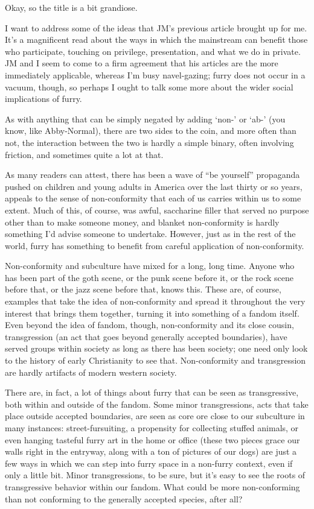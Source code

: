 
Okay, so the title is a bit grandiose.

I want to address some of the ideas that JM’s previous article brought up for me. It’s a magnificent read about the ways in which the mainstream can benefit those who participate, touching on privilege, presentation, and what we do in private. JM and I seem to come to a firm agreement that his articles are the more immediately applicable, whereas I’m busy navel-gazing; furry does not occur in a vacuum, though, so perhaps I ought to talk some more about the wider social implications of furry.

As with anything that can be simply negated by adding `non-' or `ab-' (you know, like Abby-Normal), there are two sides to the coin, and more often than not, the interaction between the two is hardly a simple binary, often involving friction, and sometimes quite a lot at that.

As many readers can attest, there has been a wave of ``be yourself'' propaganda pushed on children and young adults in America over the last thirty or so years, appeals to the sense of non-conformity that each of us carries within us to some extent. Much of this, of course, was awful, saccharine filler that served no purpose other than to make someone money, and blanket non-conformity is hardly something I’d advise someone to undertake. However, just as in the rest of the world, furry has something to benefit from careful application of non-conformity.

Non-conformity and subculture have mixed for a long, long time. Anyone who has been part of the goth scene, or the punk scene before it, or the rock scene before that, or the jazz scene before that, knows this. These are, of course, examples that take the idea of non-conformity and spread it throughout the very interest that brings them together, turning it into something of a fandom itself. Even beyond the idea of fandom, though, non-conformity and its close cousin, transgression (an act that goes beyond generally accepted boundaries), have served groups within society as long as there has been society; one need only look to the history of early Christianity to see that. Non-conformity and transgression are hardly artifacts of modern western society.

There are, in fact, a lot of things about furry that can be seen as transgressive, both within and outside of the fandom. Some minor transgressions, acts that take place outside accepted boundaries, are seen as core ore close to our subculture in many instances: street-fursuiting, a propensity for collecting stuffed animals, or even hanging tasteful furry art in the home or office (these two pieces grace our walls right in the entryway, along with a ton of pictures of our dogs) are just a few ways in which we can step into furry space in a non-furry context, even if only a little bit. Minor transgressions, to be sure, but it’s easy to see the roots of transgressive behavior within our fandom. What could be more non-conforming than not conforming to the generally accepted species, after all?

